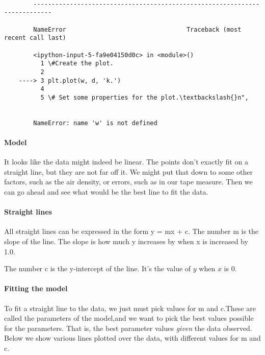 \documentclass[11pt]{article}
\begin{document}
    \begin{Verbatim}[commandchars=\\\{\}]

        ---------------------------------------------------------------------------

        NameError                                 Traceback (most recent call last)

        <ipython-input-5-fa9e04150d0c> in <module>()
          1 \#Create the plot.
          2 
    ----> 3 plt.plot(w, d, 'k.')
          4 
          5 \# Set some properties for the plot.\textbackslash{}n",


        NameError: name 'w' is not defined

    \end{Verbatim}

    \paragraph{Model}\label{model}

It looks like the data might indeed be linear. The points don't exactly
fit on a straight line, but they are not far off it. We might put that
down to some other factors, such as the air density, or errors, such as
in our tape measure. Then we can go ahead and see what would be the best
line to fit the data.

    \paragraph{Straight lines}\label{straight-lines}

All straight lines can be expressed in the form y = mx + c. The number m
is the slope of the line. The slope is how much y increases by when x is
increased by 1.0.

The number c is the y-intercept of the line. It's the value of \(y\)
when \(x\) is 0.

    \paragraph{Fitting the model}\label{fitting-the-model}

To fit a straight line to the data, we just must pick values for m and
c.These are called the parameters of the model,and we want to pick the
best values possible for the parameters. That is, the best parameter
values \emph{given} the data observed. Below we show various lines
plotted over the data, with different values for m and c.
\end{document}

